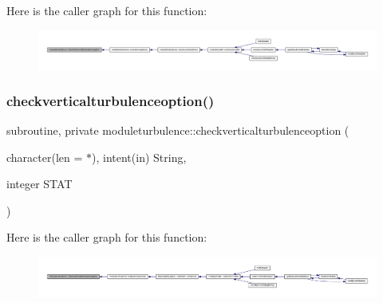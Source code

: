 Here is the caller graph for this function\+:\nopagebreak
\begin{figure}[H]
\begin{center}
\leavevmode
\includegraphics[width=350pt]{namespacemoduleturbulence_a2df9458a1ab29d4f5f3fd747ded725b4_icgraph}
\end{center}
\end{figure}
\mbox{\label{namespacemoduleturbulence_ad670a65f522fc5db35f455468f147913}} 
\subsubsection{\texorpdfstring{checkverticalturbulenceoption()}{checkverticalturbulenceoption()}}
{\footnotesize\ttfamily subroutine, private moduleturbulence\+::checkverticalturbulenceoption (\begin{DoxyParamCaption}\item[{character(len = $\ast$), intent(in)}]{String,  }\item[{integer}]{S\+T\+AT }\end{DoxyParamCaption})\hspace{0.3cm}{\ttfamily [private]}}

Here is the caller graph for this function\+:\nopagebreak
\begin{figure}[H]
\begin{center}
\leavevmode
\includegraphics[width=350pt]{namespacemoduleturbulence_ad670a65f522fc5db35f455468f147913_icgraph}
\end{center}
\end{figure}
\mbox{\label{namespacemoduleturbulence_ad38c50749e5db481714069b7e366c4e7}} 

